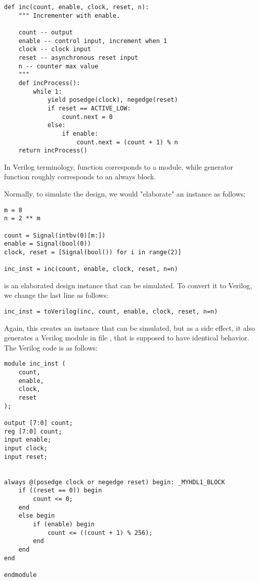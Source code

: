 \begin{verbatim}
def inc(count, enable, clock, reset, n):
    """ Incrementer with enable.
    
    count -- output
    enable -- control input, increment when 1
    clock -- clock input
    reset -- asynchronous reset input
    n -- counter max value
    """
    def incProcess():
        while 1:
            yield posedge(clock), negedge(reset)
            if reset == ACTIVE_LOW:
                count.next = 0
            else:
                if enable:
                    count.next = (count + 1) % n
    return incProcess()
\end{verbatim}

In Verilog terminology, function  corresponds to a
module, while generator function 
roughly corresponds to an always block.

Normally, to simulate the design, we would "elaborate" an instance
as follows:

\begin{verbatim}
m = 8
n = 2 ** m
 
count = Signal(intbv(0)[m:])
enable = Signal(bool(0))
clock, reset = [Signal(bool()) for i in range(2)]

inc_inst = inc(count, enable, clock, reset, n=n)
\end{verbatim}

 is an elaborated design instance that can be simulated. To
convert it to Verilog, we change the last line as follows:

\begin{verbatim}
inc_inst = toVerilog(inc, count, enable, clock, reset, n=n)
\end{verbatim}

Again, this creates an instance that can be simulated, but as a side
effect, it also generates a Verilog module in file ,
that is supposed to have identical behavior. The Verilog code
is as follows:

\begin{verbatim}
module inc_inst (
    count,
    enable,
    clock,
    reset
);

output [7:0] count;
reg [7:0] count;
input enable;
input clock;
input reset;


always @(posedge clock or negedge reset) begin: _MYHDL1_BLOCK
    if ((reset == 0)) begin
        count <= 0;
    end
    else begin
        if (enable) begin
            count <= ((count + 1) % 256);
        end
    end
end

endmodule
\end{verbatim}

